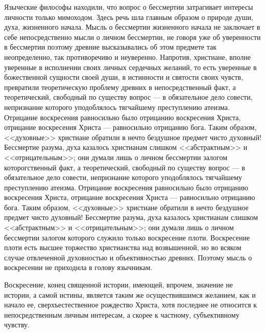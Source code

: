 \documentclass[12pt,oneside]{book}
\begin{document}
Языческие философы находили, что вопрос о бессмертии затрагивает интересы личности только мимоходом. Здесь речь шла главным образом о природе души, духа, жизненного начала. Мысль о бессмертии жизненного начала не заключает в себе непосредственно мысли о личном бессмертии, не говоря уже об уверенности в бессмертии поэтому древние высказывались об этом предмете так неопределенно, так противоречиво и неуверенно. Напротив, христиане, вполне уверенные в исполнении своих личных сердечных желаний, то есть уверенные в божественной сущности своей души, в истинности и святости своих чувств, превратили теоретическую проблему древних в непосредственный факт, а теоретический, свободный по существу вопрос --- в обязательное дело совести, непризнание которого уподоблялось тягчайшему преступлению атеизма. Отрицание воскресения равносильно было отрицанию воскресения Христа, отрицание воскресения Христа --- равносильно отрицанию бога. Таким образом, <<духовные>> христиане обратили в нечто бездушное предмет чисто духовный! Бессмертие разума, духа казалось христианам слишком <<абстрактным>> и <<отрицательным>>; они думали лишь о личном бессмертии залогом которогственный факт, а теоретический, свободный по существу вопрос --- в обязательное дело совести, непризнание которого уподоблялось тягчайшему преступлению атеизма. Отрицание воскресения равносильно было отрицанию воскресения Христа, отрицание воскресения Христа --- равносильно отрицанию бога. Таким образом, <<духовные>> христиане обратили в нечто бездушное предмет чисто духовный! Бессмертие разума, духа казалось христианам слишком <<абстрактным>> и <<отрицательным>>; они думали лишь о личном бессмертии залогом которого служило только воскресение плоти. Воскресение плоти есть высшее торжество христианства над возвышенной, но во всяком случае отвлеченной духовностью и объективностью древних. Поэтому мысль о воскресении не приходила в голову язычникам.

Воскресение, конец священной истории, имеющей, впрочем, значение не истории, а самой истины, является таким же осуществившимся желанием, как и начало ее, сверхъестественное рождество Христа, хотя последнее не относится к непосредственным личным интересам, а скорее к частному, субъективному чувству.
\end{document}
